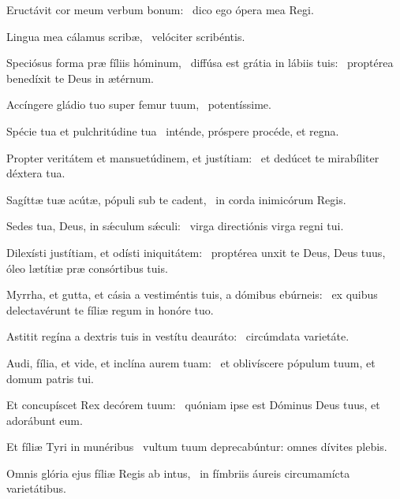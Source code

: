 \item Eructávit cor meum verbum bonum:~\psstar{} dico ego ópera mea Regi.

\item Lingua mea cálamus scribæ,~\psstar{} velóciter scribéntis.

\item Speciósus forma præ fíliis hóminum,~\pscross{} diffúsa est grátia in lábiis tuis:~\psstar{} proptérea benedíxit te Deus in ætérnum.

\item Accíngere gládio tuo super femur tuum,~\psstar{} potentíssime.

\item Spécie tua et pulchritúdine tua~\psstar{} inténde, próspere procéde, et regna.

\item Propter veritátem et mansuetúdinem, et justítiam:~\psstar{} et dedúcet te mirabíliter déxtera tua.

\item Sagíttæ tuæ acútæ, pópuli sub te cadent,~\psstar{} in corda inimicórum Regis.

\item Sedes tua, Deus, in sǽculum sǽculi:~\psstar{} virga directiónis virga regni tui.

\item Dilexísti justítiam, et odísti iniquitátem:~\psstar{} proptérea unxit te Deus, Deus tuus, óleo lætítiæ præ consórtibus tuis.

\item Myrrha, et gutta, et cásia a vestiméntis tuis, a dómibus ebúrneis:~\psstar{} ex quibus delectavérunt te fíliæ regum in honóre tuo.

\item Astitit regína a dextris tuis in vestítu deauráto:~\psstar{} circúmdata varietáte.

\item Audi, fília, et vide, et inclína aurem tuam:~\psstar{} et oblivíscere pópulum tuum, et domum patris tui.

\item Et concupíscet Rex decórem tuum:~\psstar{} quóniam ipse est Dóminus Deus tuus, et adorábunt eum.

\item Et fíliæ Tyri in munéribus~\psstar{} vultum tuum deprecabúntur: omnes dívites plebis.

\item Omnis glória ejus fíliæ Regis ab intus,~\psstar{} in fímbriis áureis circumamícta varietátibus.

